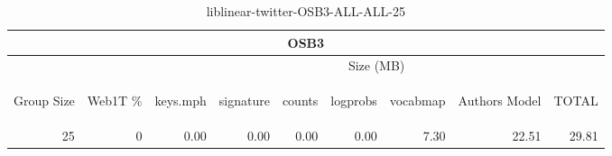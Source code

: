 \begin{center}
\begin{table}[htbp]
\begin{tabular}{ | r | r | r | r | r | r | r | r | r |}
\hline
\multicolumn{9}{|c|}{OSB3}\\
\hline
 & & \multicolumn{7}{|c|}{Size (MB)}\\ \cline{3-9}
\begin{sideways}Group Size\end{sideways} & \begin{sideways}Web1T \% \end{sideways} & \begin{sideways}keys.mph\end{sideways} & \begin{sideways}signature\end{sideways} & \begin{sideways}counts\end{sideways} & \begin{sideways}logprobs\end{sideways} & \begin{sideways}vocabmap\end{sideways} & \begin{sideways}Authors Model \end{sideways} & \begin{sideways}TOTAL\end{sideways}\\
\hline
\multirow{0}{*}{25}
 & 0 & 0.00 & 0.00 & 0.00 & 0.00 & 7.30 & 22.51 & 29.81\\ \cline{2-9}
\hline
\end{tabular}
\caption{liblinear-twitter-OSB3-ALL-ALL-25}
\label{table:liblinear-twitter-OSB3-ALL-ALL-25}
\end{table}
\end{center}

